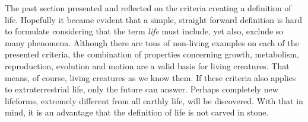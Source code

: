 The past section presented and reflected on the criteria creating a definition of life.
Hopefully it became evident that a simple, straight forward definition is hard to formulate considering that the term \textit{life} must include, yet also, exclude so many phenomena.
Although there are tons of non-living examples on each of the presented criteria, the combination of properties concerning growth, metabolism, reproduction, evolution and motion are a valid basis for living creatures.
That means, of course, living creatures as we know them.
If these criteria also applies to extraterrestrial life, only the future can answer.
Perhaps completely new lifeforms, extremely different from all earthly life, will be discovered.
With that in mind, it is an advantage that the definition of life is not carved in stone.